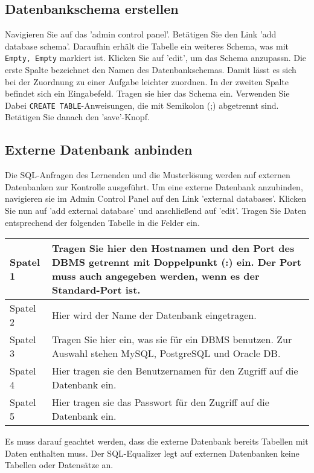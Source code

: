 \subsection{Datenbankschema erstellen}

Navigieren Sie auf das 'admin control panel'. Betätigen Sie den Link 'add database schema'. Daraufhin erhält die Tabelle ein weiteres Schema, was mit \verb|Empty, Empty| markiert ist. Klicken Sie auf 'edit', um das Schema anzupassn. Die erste Spalte bezeichnet den Namen des Datenbankschemas. Damit lässt es sich bei der Zuordnung zu einer Aufgabe leichter zuordnen. In der zweiten Spalte befindet sich ein Eingabefeld. Tragen sie hier das Schema ein. Verwenden Sie Dabei \verb|CREATE TABLE|-Anweisungen, die mit Semikolon (;) abgetrennt sind. Betätigen Sie danach den 'save'-Knopf.

\subsection{Externe Datenbank anbinden}

Die SQL-Anfragen des Lernenden und die Musterlösung werden auf externen Datenbanken zur Kontrolle ausgeführt. Um eine externe Datenbank anzubinden, navigieren sie im Admin Control Panel auf den Link 'external databases'. Klicken Sie nun auf 'add external database' und anschließend auf 'edit'.  Tragen Sie Daten entsprechend der folgenden Tabelle in die Felder ein.

\begin{tabular}{|l|p{14cm}|}\hline
Spatel 1 & Tragen Sie hier den Hostnamen und den Port des DBMS getrennt mit Doppelpunkt (:) ein. Der Port muss auch angegeben werden, wenn es der Standard-Port ist.\\\hline
Spatel 2 & Hier wird der Name der Datenbank eingetragen.\\\hline
Spatel 3 & Tragen Sie hier ein, was sie für ein DBMS benutzen. Zur Auswahl stehen MySQL, PostgreSQL und Oracle DB.\\\hline
Spatel 4 & Hier tragen sie den Benutzernamen für den Zugriff auf die Datenbank ein.\\\hline
Spatel 5 & Hier tragen sie das Passwort für den Zugriff auf die Datenbank ein.\\\hline
\end{tabular}

Es muss darauf geachtet werden, dass die externe Datenbank bereits Tabellen mit Daten enthalten muss. Der SQL-Equalizer legt auf externen Datenbanken keine Tabellen oder Datensätze an.

